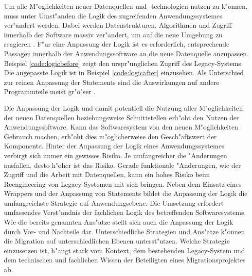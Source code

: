 Um alle M"oglichkeiten neuer Datenquellen und -technologien nutzen zu k"onnen, muss unter Umst"anden die Logik des zugreifenden Anwendungssystemes ver"andert werden. Dabei werden Datenstrukturen, Algorithmen und Zugriff innerhalb der Software massiv ver"andert, um auf die neue Umgebung zu reagieren \citep{henrard-2002}.
\lb
F"ur eine Anpassung der Logik ist es erforderlich, entsprechende Passagen innerhalb der Anwendungssoftware an die neue Datenquelle anzupassen. Beispiel \ref{code:logicbefore} zeigt den urspr"unglichen Zugriff des Legacy-Systems. Die angepasste Logik ist in Beispiel \ref{code:logicafter} einzusehen. Als Unterschied zur reinen Anpassung der Statements sind die Auswirkungen auf andere Programmteile meist gr"o"ser \citep{henrard-2002}.





Die Anpassung der Logik und damit potentiell die Nutzung aller M"oglichkeiten der neuen Datenquellen beziehungsweise Schnittstellen erh"oht den Nutzen der Anwendungssoftware. Kann das Softwaresystem von den neuen M"oglichkeiten Gebrauch machen, erh"oht dies m"oglicherweise den Gesch"aftswert der Komponente. 
\lb
Hinter der Anpassung der Logik eines Anwendungssystemes verbirgt sich immer ein gewisses Risiko. Je umfangreicher die "Anderungen ausfallen, desto h"oher ist das Risiko. Gerade funktionale "Anderungen, wie der Zugriff und die Arbeit mit Datenquellen, kann ein hohes Risiko beim Reengineering von Legacy-Systemen mit sich bringen.
\lb
Neben dem Einsatz eines Wrappers und der Anpassung von Statements bildet die Anpassung der Logik die umfangreichste Strategie auf Anwendungsebene. Die Umsetzung erfordert umfassendes Verst"andnis der fachlichen Logik des betreffenden Softwaresystems. Wie die bereits genannten Ans"atze stellt sich auch die Anpassung der Logik durch Vor- und Nachteile dar. Unterschiedliche Strategien und Ans"atze k"onnen die Migration auf unterschiedlichen Ebenen unterst"utzen. Welche Strategie einzusetzen ist, h"angt stark vom Kontext, dem bestehenden Legacy-System und dem technischen und fachlichen Wissen der Beteiligten eines Migrationsprojektes ab.